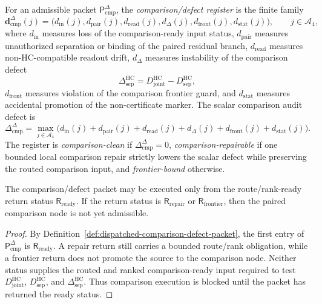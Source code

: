 \begin{definition}
\label{def:comparison-defect-register}
For an admissible packet \(\mathsf P_{\mathrm{cmp}}^{\Delta}\), the \emph{comparison/defect register} is the finite family
\[
 \mathbf d_{\mathrm{cmp}}^{\Delta}(j)
 =
 \bigl(d_{\mathrm{in}}(j),d_{\mathrm{pair}}(j),d_{\mathrm{read}}(j),d_{\Delta}(j),d_{\mathrm{front}}(j),d_{\mathrm{stat}}(j)\bigr),
 \qquad j\in\mathcal A_4,
\]
where \(d_{\mathrm{in}}\) measures loss of the comparison-ready input status, \(d_{\mathrm{pair}}\) measures unauthorized separation or binding of the paired residual branch, \(d_{\mathrm{read}}\) measures non-HC-compatible readout drift, \(d_{\Delta}\) measures instability of the comparison defect
\[
 \Delta_{\mathrm{sep}}^{\mathrm{HC}}
 =
 D_{\mathrm{joint}}^{\mathrm{HC}}-D_{\mathrm{sep}}^{\mathrm{HC}},
\]
\(d_{\mathrm{front}}\) measures violation of the comparison frontier guard, and \(d_{\mathrm{stat}}\) measures accidental promotion of the non-certificate marker. The scalar comparison audit defect is
\[
 \Delta_{\mathrm{cmp}}^{\Delta}
 =
 \max_{j\in\mathcal A_4}
 \bigl(d_{\mathrm{in}}(j)+d_{\mathrm{pair}}(j)+d_{\mathrm{read}}(j)+d_{\Delta}(j)+d_{\mathrm{front}}(j)+d_{\mathrm{stat}}(j)\bigr).
\]
The register is \emph{comparison-clean} if \(\Delta_{\mathrm{cmp}}^{\Delta}=0\), \emph{comparison-repairable} if one bounded local comparison repair strictly lowers the scalar defect while preserving the routed comparison input, and \emph{frontier-bound} otherwise.
\end{definition}

\begin{lemma}
\label{lem:route-rank-ready-return-is-comparison-precondition}
The comparison/defect packet may be executed only from the route/rank-ready return status \(\mathsf R_{\mathrm{ready}}\). If the return status is \(\mathsf R_{\mathrm{repair}}\) or \(\mathsf R_{\mathrm{frontier}}\), then the paired comparison node is not yet admissible.
\end{lemma}

\begin{proof}
By Definition~\ref{def:dispatched-comparison-defect-packet}, the first entry of \(\mathsf P_{\mathrm{cmp}}^{\Delta}\) is \(\mathsf R_{\mathrm{ready}}\). A repair return still carries a bounded route/rank obligation, while a frontier return does not promote the source to the comparison node. Neither status supplies the routed and ranked comparison-ready input required to test \(D_{\mathrm{joint}}^{\mathrm{HC}}\), \(D_{\mathrm{sep}}^{\mathrm{HC}}\), and \(\Delta_{\mathrm{sep}}^{\mathrm{HC}}\). Thus comparison execution is blocked until the packet has returned the ready status.
\end{proof}

